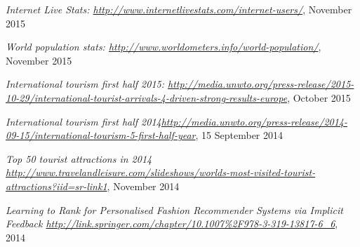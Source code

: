 \documentclass[12pt,runningheads]{article}
\begin{document}

\begin{thebibliography}{9}

  	\emph{Internet Live Stats: \newline \url{http://www.internetlivestats.com/internet-users/}}, November 2015
    
	\emph{World population stats: \newline \url{http://www.worldometers.info/world-population/}}, November 2015
    
	\emph{International tourism first half 2015: \newline \url{http://media.unwto.org/press-release/2015-10-29/international-tourist-arrivals-4-driven-strong-results-europe}}, October 2015
    
	\emph{International tourism first half 2014\newline \url{http://media.unwto.org/press-release/2014-09-15/international-tourism-5-first-half-year}}, 15 September 2014
    
	\emph{Top 50 tourist attractions in 2014 \newline \url{http://www.travelandleisure.com/slideshows/worlds-most-visited-tourist-attractions?iid=sr-link1}}, November 2014

	\emph{Learning to Rank for Personalised Fashion Recommender Systems via Implicit Feedback \url{http://link.springer.com/chapter/10.1007\%2F978-3-319-13817-6_6}}, 2014
\end{thebibliography}
\end{document}
